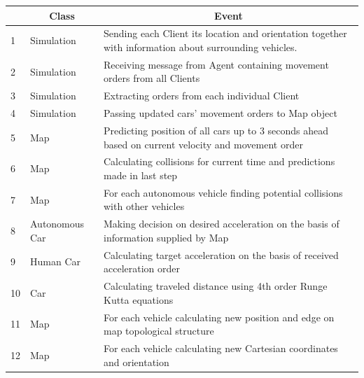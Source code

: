 \documentclass[11pt,english]{article}
\begin{document}
\begin{table}[]
\centering
\begin{tabular}{|l|p{2cm}|p{11cm}|}
\hline
\textbf{} & \multicolumn{1}{c|}{\textbf{Class}} & \multicolumn{1}{c|}{\textbf{Event}}                                                                    \\ \hline
1         & Simulation                          & Sending each Client its location and orientation together with information about surrounding vehicles. \\ \hline
2         & Simulation                          & Receiving message from Agent containing movement orders from all Clients                                \\ \hline
3         & Simulation                          & Extracting orders from each individual Client                                                          \\ \hline
4         & Simulation                          & Passing updated cars' movement orders to Map object                                                    \\ \hline
5         & Map                                 & Predicting position of all cars up to 3 seconds ahead based on current velocity and movement order     \\ \hline
6         & Map                                 & Calculating collisions for current time and predictions made in last step                              \\ \hline
7         & Map                                 & For each autonomous vehicle finding potential collisions with other vehicles                           \\ \hline
8         & Autonomous Car                      & Making decision on desired acceleration on the basis of information supplied by Map                    \\ \hline
9         & Human Car                    
& Calculating target acceleration on the basis of received acceleration order                            \\ \hline
10        & Car                                 & Calculating traveled distance using 4th order Runge Kutta equations                                    \\ \hline
11        & Map                                 & For each vehicle calculating new position and edge on map topological structure                     \\ \hline
12        & Map                                 & For each vehicle calculating new Cartesian coordinates and orientation                                 \\ \hline

\end{tabular}
\end{table}
\end{document}
